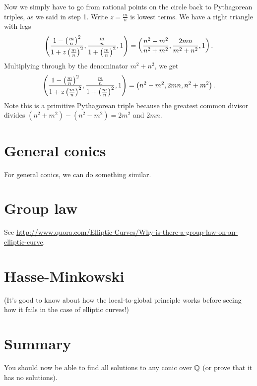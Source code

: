 \begin{enumerate}
Now we simply have to go from rational points on the circle back to Pythagorean triples, as we said in step 1. Write $z=\frac mn$ is lowest terms. We have a right triangle with legs
\[
\left( {\frac{1-\left( {\frac{m}{n}} \right)^2}{1+z\left( {\frac{m}{n}} \right)^2},\frac{\frac{m}{n}}{1+\left( {\frac{m}{n}} \right)^2},1} \right)=\left( {\frac{n^2-m^2}{n^2+m^2},\frac{2mn}{m^2+n^2},1} \right).
\]
Multiplying through by the denominator $m^2+n^2$, we get 
\[
\left( {\frac{1-\left( {\frac{m}{n}} \right)^2}{1+z\left( {\frac{m}{n}} \right)^2},\frac{\frac{m}{n}}{1+\left( {\frac{m}{n}} \right)^2},1} \right)=\left( {n^2-m^2,2mn,n^2+m^2} \right).
\]
Note this is a primitive Pythagorean triple because the greatest common divisor divides $(n^2+m^2)-(n^2-m^2)=2m^2$ and $2mn$. 
\end{enumerate}


\section{General conics}

For general conics, we can do something similar.

\section{Group law}

See \url{http://www.quora.com/Elliptic-Curves/Why-is-there-a-group-law-on-an-elliptic-curve}.


\section{Hasse-Minkowski}

(It's good to know about how the local-to-global principle works before seeing how it fails in the case of elliptic curves!)

\section{Summary}

You should now be able to find all solutions to any conic over $\mathbb{Q}$ (or prove that it has no solutions).

